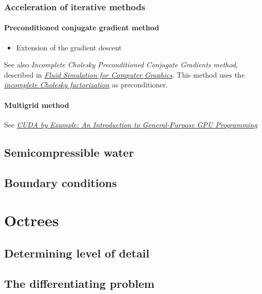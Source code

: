 \documentclass[]{report}
\begin{document}
\subsection{Acceleration of iterative methods}

\subsubsection{Preconditioned conjugate gradient method}

\begin{itemize}
    \item Extension of the gradient descent
\end{itemize}

See also \textit{Incomplete Cholesky Preconditioned Conjugate Gradients method}, described in \textit{\href{http://www.cs.ubc.ca/~rbridson/fluidbook/}{Fluid Simulation for Computer Graphics}}. This method uses the \textit{\href{http://en.wikipedia.org/wiki/Incomplete_Cholesky_factorization}{incomplete Cholesky factorization}} as preconditioner.

\subsubsection{Multigrid method}

See \textit{\href{http://developer.download.nvidia.com/books/cuda-by-example/cuda-by-example-sample.pdf}{CUDA by Example: An Introduction to General-Purpose GPU Programming}}

\section{Semicompressible water}

\section{Boundary conditions}

\chapter{Octrees}

\section{Determining level of detail}

\section{The differentiating problem}
\end{document}
